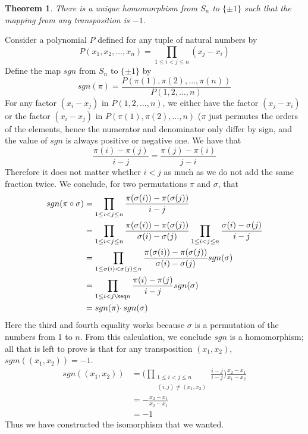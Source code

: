 \documentclass[12pt]{amsbook}
\makeatletter
\theoremstyle{plain}
\newtheorem{theorem}{Theorem}[chapter]
\theoremstyle{definition}
\renewenvironment{proof}[1][\proofname]{\par
  \pushQED{\qed}%
  \normalfont \topsep6\p@\@plus6\p@\relax
  \list{}{\leftmargin=0em
          \rightmargin=\leftmargin
          \settowidth{\itemindent}{\itshape#1}%
          \labelwidth=\itemindent}

  \item[\hskip\labelsep
        \itshape
    #1\@addpunct{.}]\ignorespaces
}{%
  \popQED\endlist\@endpefalse
}
\makeatother
\begin{document}
\begin{theorem}
    There is a unique homomorphism from $S_n$ to $\{ \pm 1 \}$ such that the mapping from any transposition is $-1$.
\end{theorem}
\begin{proof}
    Consider a polynomial $P$ defined for any tuple of natural numbers by
    \[ P(x_1, x_2, \dots, x_n) = \prod_{1 \leq i < j \leq n} (x_j - x_i) \]
    Define the map $sgn$ from $S_n$ to $\{ \pm 1 \}$ by
    \[ sgn(\pi) = \frac{P(\pi(1), \pi(2), \dots, \pi(n))}{P(1,2, \dots, n)} \]
    For any factor $(x_i - x_j)$ in $P(1, 2, \dots, n)$, we either have the factor $(x_j - x_i)$ or the factor $(x_i - x_j)$ in $P(\pi(1), \pi(2), \dots, n)$ ($\pi$ just permutes the orders of the elements, hence the numerator and denominator only differ by sign, and the value of $sgn$ is always positive or negative one. We have that
    \[ \frac{\pi(i) - \pi(j)}{i - j} = \frac{\pi(j) - \pi(i)}{j - i} \]
    Therefore it does not matter whether $i < j$ as much as we do not add the same fraction twice. We conclude, for two permutations $\pi$ and $\sigma$, that
    \begin{align*}
        sgn(\pi \circ \sigma) &= \prod_{1 \leq i < j \leq n} \frac{\pi(\sigma(i)) - \pi(\sigma(j))}{i - j}\\
        &= \prod_{1 \leq i < j \leq n} \frac{\pi(\sigma(i)) - \pi(\sigma(j))}{\sigma(i) - \sigma(j)} \prod_{1 \leq i < j \leq n} \frac{\sigma(i) - \sigma(j)}{i - j}\\
        &= \prod_{1 \leq \sigma(i) < \sigma(j) \leq n} \frac{\pi(\sigma(i)) - \pi(\sigma(j))}{\sigma(i) - \sigma(j)} sgn(\sigma)\\
        &= \prod_{1 \leq i < j \keq n} \frac{\pi(i) - \pi(j)}{i - j} sgn(\sigma)\\
        &= sgn(\pi) \cdotp sgn(\sigma)
    \end{align*}
    Here the third and fourth equality works because $\sigma$ is a permutation of the numbers from 1 to $n$. From this calculation, we conclude $sgn$ is a homomorphism; all that is left to prove is that for any transposition $(x_1, x_2)$, $sgm((x_1, x_2)) = -1$.
    \begin{align*}
        sgn((x_1, x_2)) &= \Bigg( \prod_{\substack{1 \leq i < j \leq n\\(i,j) \neq (x_1, x_2)}} \frac{i - j}{i - j} \Bigg) \frac{x_2 - x_1}{x_1 - x_2}\\
        &= - \frac{x_2 - x_1}{x_2 - x_1}\\
        &= -1
    \end{align*}
    Thus we have constructed the isomorphism that we wanted.
\end{proof}
\end{document}

